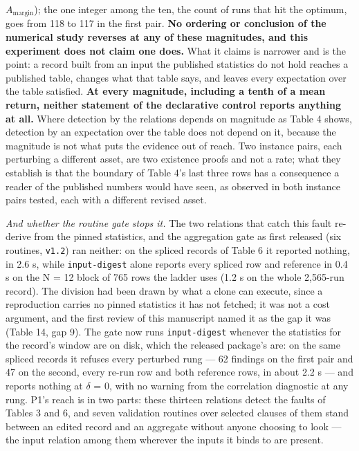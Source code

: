 \documentclass[acmsmall,screen,review]{acmart}
\begin{document}
$A_{\mathrm{margin}}$); the one integer among the ten, the count of runs that hit the optimum, goes from 118 to 117 in the first pair. \textbf{No ordering or conclusion of the numerical study reverses at any of these magnitudes, and this experiment does not claim one does.} What it claims is narrower and is the point: a record built from an input the published statistics do not hold reaches a published table, changes what that table says, and leaves every expectation over the table satisfied. \textbf{At every magnitude, including a tenth of a mean return, neither statement of the declarative control reports anything at all.} Where detection by the relations depends on magnitude as Table 4 shows, detection by an expectation over the table does not depend on it, because the magnitude is not what puts the evidence out of reach. Two instance pairs, each perturbing a different asset, are two existence proofs and not a rate; what they establish is that the boundary of Table 4's last three rows has a consequence a reader of the published numbers would have seen, as observed in both instance pairs tested, each with a different revised asset.


\textit{And whether the routine gate stops it.} The two relations that catch this fault re-derive from the pinned statistics, and the aggregation gate as first released (six routines, \texttt{v1.2}) ran neither: on the spliced records of Table 6 it reported nothing, in 2.6 s, while \texttt{input-digest} alone reports every spliced row and reference in 0.4 s on the N = 12 block of 765 rows the ladder uses (1.2 s on the whole 2,565-run record). The division had been drawn by what a clone can execute, since a reproduction carries no pinned statistics it has not fetched; it was not a cost argument, and the first review of this manuscript named it as the gap it was (Table 14, gap 9). The gate now runs \texttt{input-digest} whenever the statistics for the record's window are on disk, which the released package's are: on the same spliced records it refuses every perturbed rung --- 62 findings on the first pair and 47 on the second, every re-run row and both reference rows, in about 2.2 s --- and reports nothing at $\delta$ = 0, with no warning from the correlation diagnostic at any rung. P1's reach is in two parts: these thirteen relations detect the faults of Tables 3 and 6, and seven validation routines over selected clauses of them stand between an edited record and an aggregate without anyone choosing to look --- the input relation among them wherever the inputs it binds to are present.
\end{document}
